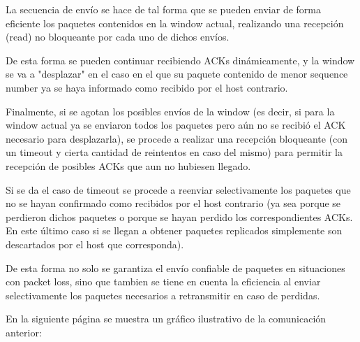 \documentclass[11pt,a4paper]{article}
\begin{document}
La secuencia de envío se hace de tal forma que se pueden enviar de forma eficiente los paquetes contenidos en la window actual, realizando una recepción (read) no bloqueante por cada uno de dichos envíos. 

De esta forma se pueden continuar recibiendo ACKs dinámicamente, y la window se va a "desplazar" en el caso en el que su paquete contenido de menor sequence number ya se haya informado como recibido por el host contrario. 

Finalmente, si se agotan los posibles envíos de la window (es decir, si para la window actual ya se enviaron todos los paquetes pero aún no se recibió el ACK necesario para desplazarla), se procede a realizar una recepción bloqueante (con un timeout y cierta cantidad de reintentos en caso del mismo) para permitir la recepción de posibles ACKs que aun no hubiesen llegado. 

Si se da el caso de timeout se procede a reenviar selectivamente los paquetes que no se hayan confirmado como recibidos por el host contrario (ya sea porque se perdieron dichos paquetes o porque se hayan perdido los correspondientes ACKs. En este último caso si se llegan a obtener paquetes replicados simplemente son descartados por el host que corresponda). 

De esta forma no solo se garantiza el envío confiable de paquetes en situaciones con packet loss, sino que tambien se tiene en cuenta la eficiencia al enviar selectivamente los paquetes necesarios a retransmitir en caso de perdidas. 


En la siguiente página se muestra un gráfico ilustrativo de la comunicación anterior:

\newpage
\end{document}
